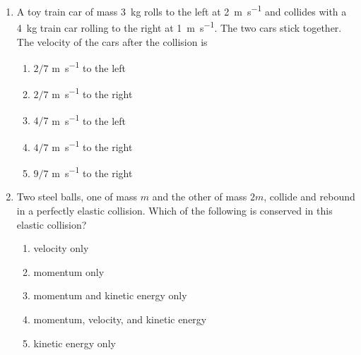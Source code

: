 \documentclass{../../../oss-apphys}
\begin{document}
\genheader


\genmultidirections

\gengravity

\raggedcolumns
\begin{multicols}{2}

  \begin{enumerate}[leftmargin=18pt]

  \item A toy train car of mass \SI{3}{\kilo\gram} rolls to the left at
    \SI{2}{\metre\per\second} and collides with a \SI{4}{\kilo\gram} train
    car rolling to the right at \SI{1}{\metre\per\second}. The two cars stick
    together. The velocity of the cars after the collision is
    \begin{enumerate}[nosep,leftmargin=18pt,label=(\Alph*)]
    \item $2/7$ \si{\metre\per\second} to the left
    \item $2/7$ \si{\metre\per\second} to the right
    \item $4/7$ \si{\metre\per\second} to the left
    \item $4/7$ \si{\metre\per\second} to the right
    \item $9/7$ \si{\metre\per\second} to the right
    \end{enumerate}
    
  \item Two steel balls, one of mass $m$ and the other of mass $2m$, collide and
    rebound in a perfectly elastic collision. Which of the following is
    conserved in this elastic collision?
    \begin{enumerate}[nosep,leftmargin=18pt,label=(\Alph*)]
    \item velocity only
    \item momentum only
    \item momentum and kinetic energy only
    \item momentum, velocity, and kinetic energy
    \item kinetic energy only
    \end{enumerate}
    

\end{enumerate}
\end{multicols}
\end{document}
